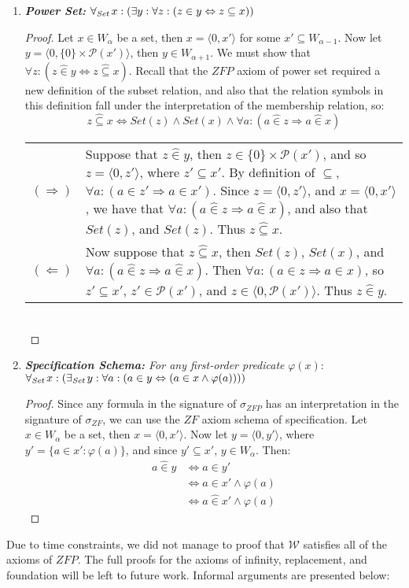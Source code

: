 \documentclass[11pt]{report}
\newcommand{\all}[1]{\forall_{\mathit{#1}}\hspace{0.5mm}}
\newcommand{\ex}[1]{\exists_{\mathit{#1}}\hspace{0.5mm}}
\newcommand{\pair}[2]{\langle #1,#2 \rangle}
\newcommand{\zin}{\mathrel{\widehat{\in}}}
\theoremstyle{definition}
\theoremstyle{theorem}
\theoremstyle{lemma}
\begin{document}
\begin{enumerate}[resume=axiomlist, label=\Roman*.]
\item \textit{\textbf{Power Set:}} $\all{Set}x:(\exists y:\forall z:(z\in y \Leftrightarrow z\subseteq x))$
\begin{proof}
  Let $x\in W_\alpha$ be a set, then $x=\pair{0}{x'}$ for some $x'\subseteq W_{\alpha-1}$.
  Now let $y=\pair{0}{\{0\}\times\mathcal{P}(x')}$, then $y\in W_{\alpha+1}$.
  We must show that $\forall z: (z\zin y \Leftrightarrow z\mathrel{\widehat\subseteq} x)$.
  Recall that the $\mathit{ZFP}$ axiom of power set required a new definition of the subset relation, and also that the relation symbols in this definition fall under the interpretation of the membership relation, so:
    $$z\mathrel{\widehat\subseteq} x \iff \mathit{Set}(z)\wedge\mathit{Set}(x)
                        \wedge \forall a: (a\zin z \Rightarrow a\zin x)$$
\begin{tabular}{p{7mm} p{133mm}}
  $(\Rightarrow)$\rule{0pt}{5mm} &
  Suppose that $z\zin y$, then $z\in\{0\}\times\mathcal{P}(x')$, and so $z=\pair{0}{z'}$, where $z'\subseteq x'$.
  By definition of $\subseteq$, $\forall a:(a\in z' \Rightarrow a\in x')$.
  Since $z=\pair{0}{z'}$, and $x=\pair{0}{x'}$, we have that $\forall a: (a\zin z \Rightarrow a\zin x)$, and also that $\mathit{Set}(z)$, and $\mathit{Set}(z)$. Thus $z\mathrel{\widehat\subseteq}x$.
  \\
  $(\Leftarrow)$ &\rule{0pt}{5mm}
  Now suppose that $z\mathrel{\widehat\subseteq}x$, then $\mathit{Set}(z)$, $\mathit{Set}(x)$, and $\forall a:(a\zin z\Rightarrow a\zin x)$.
  Then $\forall a:(a\in z\Rightarrow a\in x)$, so $z'\subseteq x'$, $z'\in \mathcal{P}(x')$, and $z\in\pair{0}{\mathcal{P}(x')}$.
  Thus $z\zin y$.\qedhere
\end{tabular}\\
\end{proof}

\item \textit{\textbf{Specification Schema:} For any first-order predicate} $\varphi(x)$: \\
$\all{Set}x: (\ex{Set}y: \forall a:
                              (a\in y \Leftrightarrow (a\in x \wedge \varphi(a))))$
\begin{proof}
Since any formula in the signature of $\sigma_{\mathit{ZFP}}$ has an interpretation in the signature of $\sigma_{\mathit{ZF}}$, we can use the $\mathit{ZF}$ axiom schema of specification.
Let $x\in W_\alpha$ be a set, then $x=\pair{0}{x'}$.
Now let $y=\pair{0}{y'}$, where $y'=\{a\in x' : \varphi(a)\}$, and since $y'\subseteq x'$, $y\in W_\alpha$. Then:
\begin{align*}
  a\zin y &\iff a\in y'\\
          &\iff a\in x'\wedge \varphi(a)\\
          &\iff a\zin x' \wedge \varphi(a)
\end{align*}
\end{proof}
\end{enumerate}
Due to time constraints, we did not manage to proof that $\mathcal{W}$ satisfies all of the axioms of $\mathit{ZFP}$. 
The full proofs for the axioms of infinity, replacement, and foundation will be left to future work.
Informal arguments are presented below: 
\end{document}
